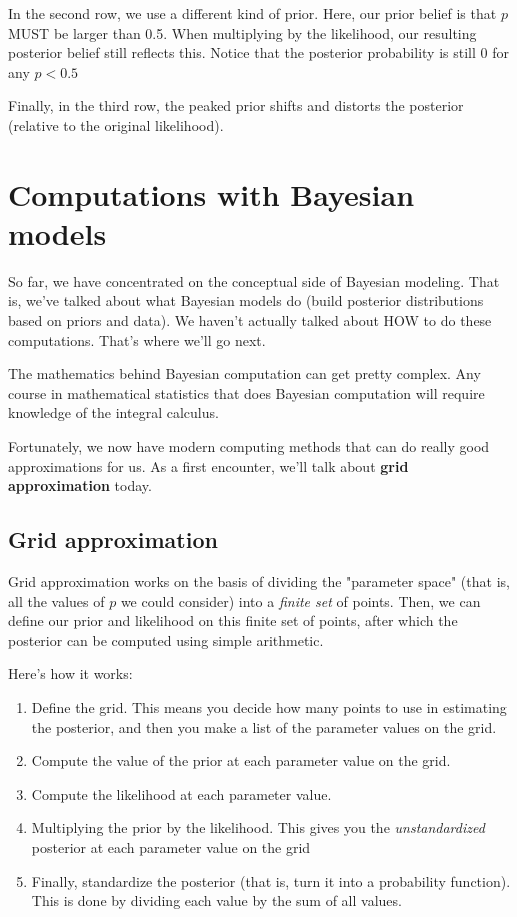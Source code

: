 \documentclass[11pt]{article}
\begin{document}
In the second row, we use a different kind of prior.  Here, our prior belief is that $p$ MUST be larger than 0.5.  When multiplying by the likelihood, our resulting posterior belief still reflects this.  Notice that the posterior probability is still 0 for any $p<0.5$

Finally, in the third row, the peaked prior shifts and distorts the posterior (relative to the original likelihood).

\section*{Computations with Bayesian models}
\label{sec-6}
So far, we have concentrated on the conceptual side of Bayesian modeling.  That is, we've talked about what Bayesian models do (build posterior distributions based on priors and data).  We haven't actually talked about HOW to do these computations.  That's where we'll go next.

The mathematics behind Bayesian computation can get pretty complex.  Any course in mathematical statistics that does Bayesian computation will require knowledge of the integral calculus.

Fortunately, we now have modern computing methods that can do really good approximations for us.  As a first encounter, we'll talk about \textbf{grid approximation} today.

\subsection*{Grid approximation}
\label{sec-6-1}

Grid approximation works on the basis of dividing the "parameter space" (that is, all the values of $p$ we could consider) into a \emph{finite set} of points.  Then, we can define our prior and likelihood on this finite set of points, after which the posterior can be computed using simple arithmetic.  

Here's how it works:

\begin{enumerate}
\item Define the grid. This means you decide how many points to use in estimating the posterior, and then you make a list of the parameter values on the grid.
\item Compute the value of the prior at each parameter value on the grid.
\item Compute the likelihood at each parameter value.
\item Multiplying the prior by the likelihood.  This gives you the \emph{unstandardized} posterior at each parameter value on the grid
\item Finally, standardize the posterior (that is, turn it into a probability function).  This is done by dividing each value by the sum of all values.
\end{enumerate}
\end{document}
